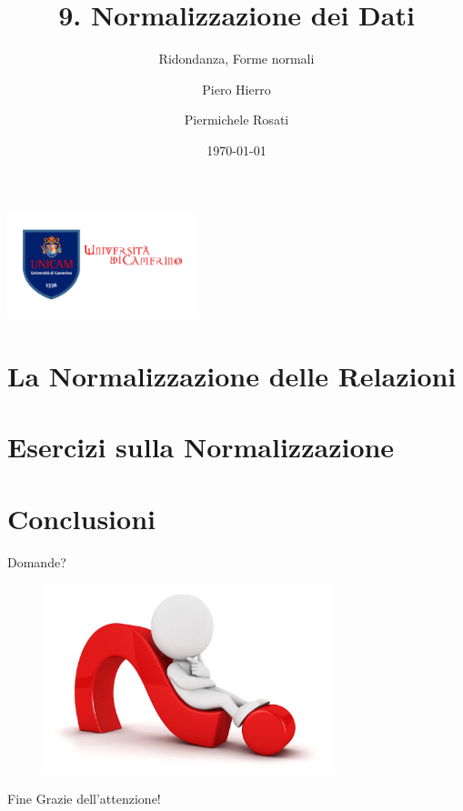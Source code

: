 \documentclass[11pt,aspectratio=169]{beamer}
\author[Piero Hierro \and Piermichele Rosati]{Piero Hierro \and Piermichele Rosati}
\institute[]{\large Universit\`a di Camerino\\ \footnotesize Tutorato - Basi di Dati}
\title[Normalizzazione dei Dati]{9. Normalizzazione dei Dati}
\subtitle{Ridondanza, Forme normali}
\begin{document}
\begin{frame}
\centering
\includegraphics[width=5.5cm]{../img/unicam-logo.jpg}
\date{\today}
\titlepage
\end{frame}


\section{La Normalizzazione delle Relazioni}

%
\section{Esercizi sulla Normalizzazione}

%
\section{Conclusioni}

\begin{frame}{Domande?}
    \begin{figure}
\centering
    \includegraphics[width=0.75\textwidth]{../img/questions.jpg}
\end{figure}
\end{frame}

\begin{frame}{Fine}
    \centering
    \huge Grazie dell'attenzione!
\end{frame}
\end{document}
